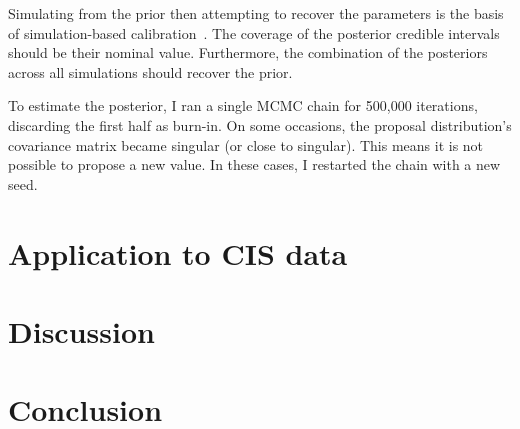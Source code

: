 \documentclass[thesis.tex]{subfiles}
\begin{document}
Simulating from the prior then attempting to recover the parameters is the basis of simulation-based calibration~\autocite{taltsValidating}.
The coverage of the posterior credible intervals should be their nominal value.
Furthermore, the combination of the posteriors across all simulations should recover the prior.

To estimate the posterior, I ran a single MCMC chain for 500,000 iterations, discarding the first half as burn-in.
On some occasions, the proposal distribution's covariance matrix became singular (or close to singular).
This means it is not possible to propose a new value.
In these cases, I restarted the chain with a new seed.

\section{Application to CIS data} \label{SEIR:sec:application}

\section{Discussion} \label{SEIR:sec:discussion}

\section{Conclusion}

\ifSubfilesClassLoaded{
  \listoftodos
}{}
\end{document}
